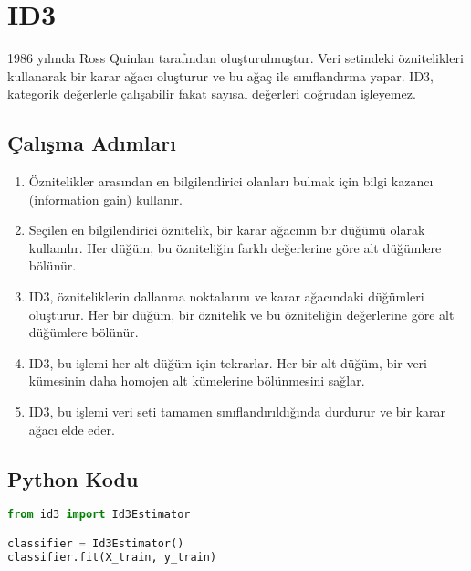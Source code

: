 \section{ID3}
1986 yılında Ross Quinlan tarafından oluşturulmuştur. Veri setindeki öznitelikleri kullanarak bir karar ağacı oluşturur ve bu ağaç ile sınıflandırma yapar. ID3, kategorik değerlerle çalışabilir fakat sayısal değerleri doğrudan işleyemez.

\subsection{Çalışma Adımları}
\begin{enumerate}
    \item Öznitelikler arasından en bilgilendirici olanları bulmak için bilgi kazancı (information gain) kullanır.
    \item Seçilen en bilgilendirici öznitelik, bir karar ağacının bir düğümü olarak kullanılır. Her düğüm, bu özniteliğin farklı değerlerine göre alt düğümlere bölünür.
    \item ID3, özniteliklerin dallanma noktalarını ve karar ağacındaki düğümleri oluşturur. Her bir düğüm, bir öznitelik ve bu özniteliğin değerlerine göre alt düğümlere bölünür.
    \item ID3, bu işlemi her alt düğüm için tekrarlar. Her bir alt düğüm, bir veri kümesinin daha homojen alt kümelerine bölünmesini sağlar.
    \item ID3, bu işlemi veri seti tamamen sınıflandırıldığında durdurur ve bir karar ağacı elde eder.
\end{enumerate}

\subsection{Python Kodu}

\begin{lstlisting}[language=Python]
from id3 import Id3Estimator

classifier = Id3Estimator()
classifier.fit(X_train, y_train)
\end{lstlisting}

\newpage
